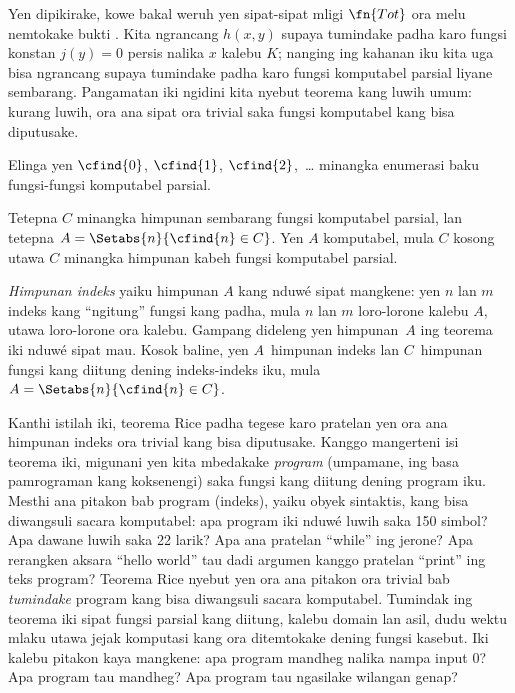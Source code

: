 \documentclass[../../../include/open-logic-section]{subfiles}
\begin{document}

Yen dipikirake, kowe bakal weruh yen sipat-sipat mligi
$\fn{Tot}$ ora melu nemtokake bukti .
Kita ngrancang $h(x,y)$ supaya tumindake padha karo
fungsi konstan $j(y) = 0$ persis nalika $x$ kalebu $K$;
nanging ing kahanan iku kita uga bisa ngrancang supaya
tumindake padha karo fungsi komputabel parsial liyane
sembarang. Pangamatan iki ngidini kita nyebut teorema
kang luwih umum: kurang luwih, ora ana sipat ora trivial
saka fungsi komputabel kang bisa diputusake.

Elinga yen $\cfind{0}$, $\cfind{1}$, $\cfind{2}$,~\dots
minangka enumerasi baku fungsi-fungsi komputabel parsial.

\begin{thm}
  Tetepna $C$ minangka himpunan sembarang fungsi
  komputabel parsial, lan tetepna $A =
  \Setabs{n}{\cfind{n} \in C}$. Yen $A$ komputabel,
  mula $C$ kosong utawa $C$ minangka himpunan kabeh
  fungsi komputabel parsial.
\end{thm}

{\em Himpunan indeks} yaiku himpunan $A$ kang nduwé sipat
mangkene: yen $n$ lan $m$ indeks kang ``ngitung'' fungsi
kang padha, mula $n$ lan $m$ loro-lorone kalebu $A$,
utawa loro-lorone ora kalebu. Gampang dideleng yen
himpunan~$A$ ing teorema iki nduwé sipat mau. Kosok
baline, yen $A$~himpunan indeks lan $C$~himpunan fungsi
kang diitung dening indeks-indeks iku, mula
$A = \Setabs{n}{\cfind{n} \in C}$.

\begin{explain}
Kanthi istilah iki, teorema Rice padha tegese karo
pratelan yen ora ana himpunan indeks ora trivial kang
bisa diputusake. Kanggo mangerteni isi teorema iki,
migunani yen kita mbedakake \emph{program}
(umpamane, ing basa pamrograman kang koksenengi)
saka fungsi kang diitung dening program iku.
Mesthi ana pitakon bab program (indeks), yaiku
obyek sintaktis, kang bisa diwangsuli sacara komputabel:
apa program iki nduwé luwih saka 150 simbol?
Apa dawane luwih saka 22 larik? Apa ana pratelan
``while'' ing jerone? Apa rerangken aksara ``hello world''
tau dadi argumen kanggo pratelan ``print'' ing teks program?
Teorema Rice nyebut yen ora ana pitakon ora trivial
bab \emph{tumindake} program kang bisa diwangsuli
sacara komputabel. Tumindak ing teorema iki sipat fungsi parsial kang diitung, kalebu domain lan asil, dudu wektu mlaku utawa jejak komputasi kang ora ditemtokake dening fungsi kasebut. Iki kalebu pitakon kaya mangkene:
apa program mandheg nalika nampa input $0$?
Apa program tau mandheg? Apa program tau
ngasilake wilangan genap?
\end{explain}
\end{document}
